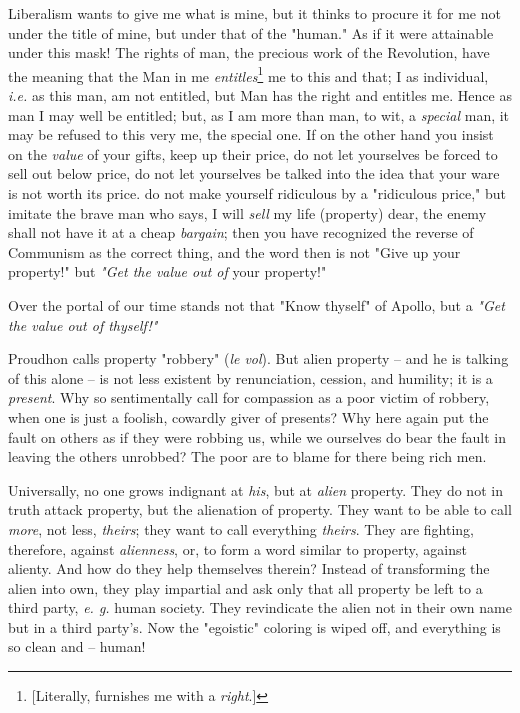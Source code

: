 Liberalism wants to give me what is mine, but it thinks to procure it for me 
not under the title of mine, but under that of the "{}human."{} As if it were 
attainable under this mask! The rights of man, the precious work of the 
Revolution, have the meaning that the Man in me 
\textit{entitles}\footnote{[Literally, furnishes me with a \textit{right}.]} 
me to this and that; I as individual, \textit{i.e.} as this man, am not 
entitled, but Man has the right and entitles me. Hence as man I may well be 
entitled; but, as I am more than man, to wit, a \textit{special} man, it may 
be refused to this very me, the special one. If on the other hand you insist 
on the \textit{value} of your gifts, keep up their price, do not let 
yourselves be forced to sell out below price, do not let yourselves be talked 
into the idea that your ware is not worth its price. do not make yourself 
ridiculous by a "{}ridiculous price,"{} but imitate the brave man who says, I 
will \textit{sell} my life (property) dear, the enemy shall not have it at a 
cheap \textit{bargain}; then you have recognized the reverse of Communism as 
the correct thing, and the word then is not "{}Give up your property!"{} but 
\textit{"{}Get the value out of} your property!"{}

Over the portal of our time stands not that "{}Know thyself"{} of Apollo, but 
a \textit{"{}Get the value out of thyself!"{}}

Proudhon calls property "{}robbery"{} (\textit{le vol}). But alien property -- 
and he is talking of this alone -- is not less existent by renunciation, 
cession, and humility; it is a \textit{present}. Why so sentimentally call for 
compassion as a poor victim of robbery, when one is just a foolish, cowardly 
giver of presents? Why here again put the fault on others as if they were 
robbing us, while we ourselves do bear the fault in leaving the others 
unrobbed? The poor are to blame for there being rich men.

Universally, no one grows indignant at \textit{his}, but at \textit{alien} 
property. They do not in truth attack property, but the alienation of 
property. They want to be able to call \textit{more}, not less, 
\textit{theirs}; they want to call everything \textit{theirs}. They are 
fighting, therefore, against \textit{alienness}, or, to form a word similar to 
property, against alienty. And how do they help themselves therein? Instead of 
transforming the alien into own, they play impartial and ask only that all 
property be left to a third party, \textit{e. g.} human society. They 
revindicate the alien not in their own name but in a third party's. Now the 
"{}egoistic"{} coloring is wiped off, and everything is so clean and -- human!

